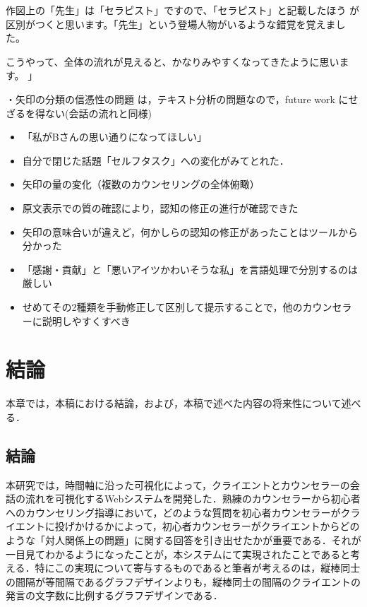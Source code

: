 \documentclass[shuuron]{kuee}
\begin{document}
作図上の「先生」は「セラピスト」ですので、「セラピスト」と記載したほう
が区別がつくと思います。「先生」という登場人物がいるような錯覚を覚えまし
た。

こうやって、全体の流れが見えると、かなりみやすくなってきたように思いま
す。
」

・矢印の分類の信憑性の問題
は，テキスト分析の問題なので，future work にせざるを得ない(会話の流れと同様)

\begin{itemize}

\item 「私がBさんの思い通りになってほしい」
\item 自分で閉じた話題「セルフタスク」への変化がみてとれた．
\item 矢印の量の変化（複数のカウンセリングの全体俯瞰）
\item 原文表示での質の確認により，認知の修正の進行が確認できた
 \end{itemize}





 \begin{itemize}

 \item 矢印の意味合いが違えど，何かしらの認知の修正があったことはツールから分かった
 \item 「感謝・貢献」と「悪いアイツかわいそうな私」を言語処理で分別するのは厳しい

  \item せめてその2種類を手動修正して区別して提示することで，他のカウンセラーに説明しやすくすべき

\end{itemize}
\chapter{結論}

本章では，本稿における結論，および，本稿で述べた内容の将来性について述べる．

\section{結論}

本研究では，時間軸に沿った可視化によって，クライエントとカウンセラーの会話の流れを可視化するWebシステムを開発した．熟練のカウンセラーから初心者へのカウンセリング指導において，どのような質問を初心者カウンセラーがクライエントに投げかけるかによって，初心者カウンセラーがクライエントからどのような「対人関係上の問題」に関する回答を引き出せたかが重要である．それが一目見てわかるようになったことが，本システムにて実現されたことであると考える．特にこの実現について寄与するものであると筆者が考えるのは，縦棒同士の間隔が等間隔であるグラフデザインよりも，縦棒同士の間隔のクライエントの発言の文字数に比例するグラフデザインである．
\end{document}
